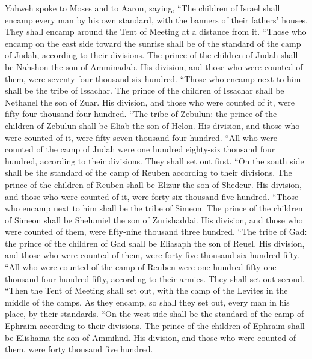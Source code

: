 Yahweh spoke to Moses and to Aaron, saying,
 ``The children of Israel shall encamp every man by his
own standard, with the banners of their fathers' houses. They shall
encamp around the Tent of Meeting at a distance from it. 
``Those who encamp on the east side toward the sunrise shall be of the
standard of the camp of Judah, according to their divisions. The prince
of the children of Judah shall be Nahshon the son of Amminadab.
 His division, and those who were counted of them, were
seventy-four thousand six hundred.  ``Those who encamp
next to him shall be the tribe of Issachar. The prince of the children
of Issachar shall be Nethanel the son of Zuar.  His
division, and those who were counted of it, were fifty-four thousand
four hundred.  ``The tribe of Zebulun: the prince of the
children of Zebulun shall be Eliab the son of Helon.  His
division, and those who were counted of it, were fifty-seven thousand
four hundred.  ``All who were counted of the camp of Judah
were one hundred eighty-six thousand four hundred, according to their
divisions. They shall set out first.  ``On the south side
shall be the standard of the camp of Reuben according to their
divisions. The prince of the children of Reuben shall be Elizur the son
of Shedeur.  His division, and those who were counted of
it, were forty-six thousand five hundred.  ``Those who
encamp next to him shall be the tribe of Simeon. The prince of the
children of Simeon shall be Shelumiel the son of Zurishaddai.
 His division, and those who were counted of them, were
fifty-nine thousand three hundred.  ``The tribe of Gad:
the prince of the children of Gad shall be Eliasaph the son of Reuel.
 His division, and those who were counted of them, were
forty-five thousand six hundred fifty.  ``All who were
counted of the camp of Reuben were one hundred fifty-one thousand four
hundred fifty, according to their armies. They shall set out second.
 ``Then the Tent of Meeting shall set out, with the camp
of the Levites in the middle of the camps. As they encamp, so shall they
set out, every man in his place, by their standards. 
``On the west side shall be the standard of the camp of Ephraim
according to their divisions. The prince of the children of Ephraim
shall be Elishama the son of Ammihud.  His division, and
those who were counted of them, were forty thousand five hundred.
